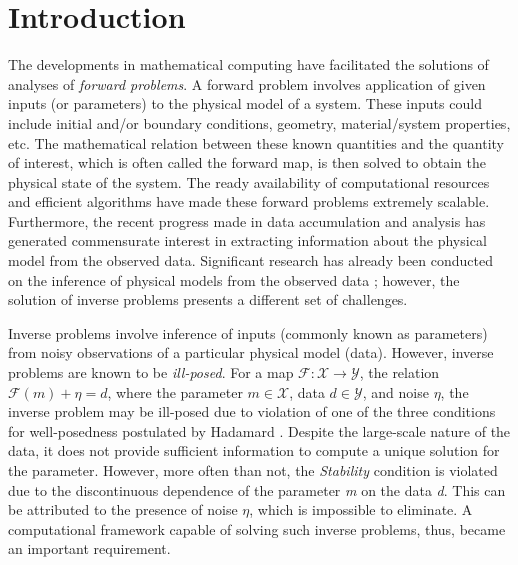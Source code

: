 \chapter{Introduction}
\label{chapter:introduction}


The developments in mathematical computing have facilitated the solutions of analyses of \textit{forward problems}. A forward problem involves application of given inputs (or parameters) to the physical model of a system. These inputs could include initial and/or boundary conditions, geometry, material/system properties, etc. The mathematical relation between these known quantities and the quantity of interest, which is often called the forward map, is then solved to obtain the physical state of the system. The ready availability of computational resources and efficient algorithms have made these forward problems extremely scalable. Furthermore, the recent progress made in data accumulation and analysis has generated commensurate interest in extracting information about the physical model from the observed data. Significant research has already been conducted on the inference of physical models from the observed data \cite{banks2012estimation, sullivan2015introduction}; however, the solution of inverse problems presents a different set of challenges.

Inverse problems involve inference of inputs (commonly known as parameters) from noisy observations of a particular physical model (data). However, inverse problems are known to be \textit{ill-posed}. For a map $\mathcal{F} : \mathcal{X} \rightarrow \mathcal{Y}$, the relation $\mathcal{F}(m) + \eta = d$, where the parameter $m \in \mathcal{X}$, data $d \in \mathcal{Y}$, and noise $\eta$, the inverse problem may be ill-posed due to violation of one of the three conditions for well-posedness postulated by Hadamard \cite{hadamard1923lectures}. Despite the large-scale nature of the data, it does not provide sufficient information to compute a unique solution for the parameter. However, more often than not, the \textit{Stability} condition is violated due to the discontinuous dependence of the parameter \textit{m} on the data \textit{d}. This can be attributed to the presence of noise $\eta$, which is impossible to eliminate. A computational framework capable of solving such inverse problems, thus, became an important requirement.

